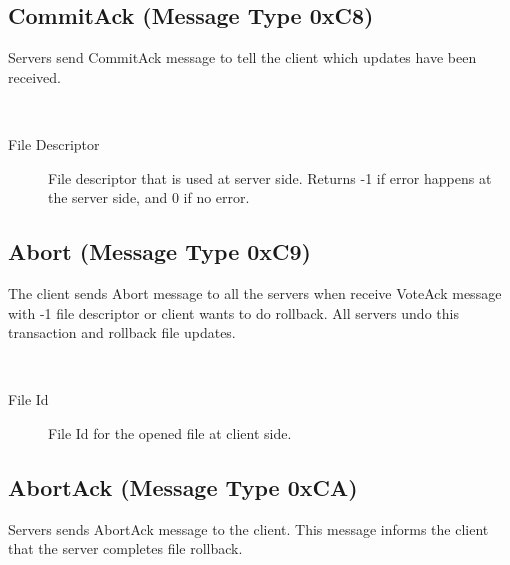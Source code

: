 \documentclass[12pt,fleqn]{article}
\begin{document}
\subsection{CommitAck (Message Type 0xC8)}
Servers send CommitAck message to tell the client which updates have been received.

\begin{center}
	\begin{bytefield}[bitwidth=1.1em]{16}
		 \\
	\end{bytefield}
\end{center}

\begin{description}
	\item[File Descriptor] File descriptor that is used at server side. Returns -1 if error happens at the server side, and 0 if no error.
\end{description}

\subsection{Abort (Message Type 0xC9)}
The client sends Abort message to all the servers when receive VoteAck message with -1 file descriptor or client wants to do rollback. All servers undo this transaction and rollback file updates.

\begin{center}
	\begin{bytefield}[bitwidth=1.1em]{16}
		 \\
	\end{bytefield}
\end{center}

\begin{description}
	\item[File Id] File Id for the opened file at client side.
\end{description}

\subsection{AbortAck (Message Type 0xCA)}
Servers sends AbortAck message to the client. This message informs the client that the server completes file rollback.

\begin{center}
	\begin{bytefield}[bitwidth=1.1em]{16}
		 \\
	\end{bytefield}
\end{center}
\end{document}

